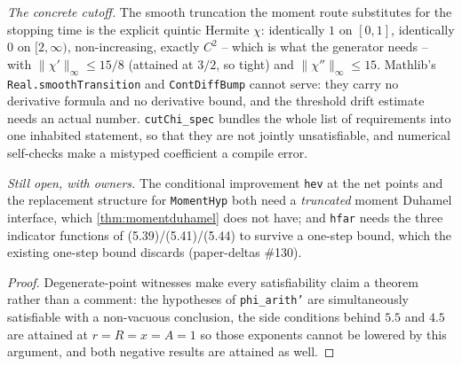 \begin{theorem}
  \emph{The concrete cutoff.}  The smooth truncation the moment route substitutes for the
  stopping time is the explicit quintic Hermite $\chi$: identically $1$ on $[0,1]$, identically
  $0$ on $[2,\infty)$, non-increasing, exactly $C^2$ -- which is what the generator needs -- with
  $\|\chi'\|_\infty\le15/8$ (attained at $3/2$, so tight) and $\|\chi''\|_\infty\le15$.  Mathlib's
  \texttt{Real.smoothTransition} and \texttt{ContDiffBump} cannot serve: they carry no derivative
  formula and no derivative bound, and the threshold drift estimate needs an actual number.
  \texttt{cutChi\_spec} bundles the whole list of requirements into one inhabited statement, so
  that they are not jointly unsatisfiable, and numerical self-checks make a mistyped coefficient a
  compile error.

  \emph{Still open, with owners.}  The conditional improvement \texttt{hev} at the net points and
  the replacement structure for \texttt{MomentHyp} both need a \emph{truncated} moment Duhamel
  interface, which \ref{thm:momentduhamel} does not have; and \texttt{hfar} needs the three
  indicator functions of (5.39)/(5.41)/(5.44) to survive a one-step bound, which the existing
  one-step bound discards (paper-deltas \#130).
\end{theorem}
\begin{proof}\leanok
  Degenerate-point witnesses make every satisfiability claim a theorem rather than a comment: the
  hypotheses of \texttt{phi\_arith'} are simultaneously satisfiable with a non-vacuous conclusion,
  the side conditions behind $5.5$ and $4.5$ are attained at $r=R=x=A=1$ so those exponents cannot
  be lowered by this argument, and both negative results are attained as well.
\end{proof}

